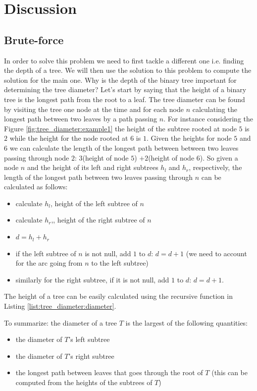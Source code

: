\section{Discussion}
\label{tree_diameter:sec:discussion}


\subsection{Brute-force}
\label{tree_diameter:sec:bruteforce}

In order to  solve this problem we need to  first tackle a different one i.e. finding the depth of a tree. We will then use the solution to this problem to compute the solution for the main one. 
Why is the depth of the binary tree important for determining the tree diameter? Let's start by saying that the height of a binary tree is the longest path from the root to a leaf. The tree diameter can be found by visiting the tree one node at the time and for each node $n$ calculating the longest path between two leaves by a path passing $n$. For instance considering the Figure \ref{fig:tree_diameter:example1} the height of the subtree rooted at node $5$ is $2$ while the height for the node rooted at $6$ is $1$. Given the heights for node $5$ and $6$ we can calculate the length of the longest path between between two leaves  passing through node $2$: $3$(height of node $5$) $+2$(height of node $6$). So given a node $n$ and the height of its left and right subtrees $h_l$ and $h_r$, respectively, the length of the longest path between two leaves passing through $n$ can be calculated as follows:

\begin{itemize}
	\item calculate $h_l$, height of the left subtree  of $n$
	\item calculate $h_r$,, height of the right subtree  of $n$
	\item $d=h_l+h_r$
	\item if the left subtree of $n$ is not null, add $1$ to $d$: $d=d+1$ (we need to account for the arc going from $n$ to the left subtree)
	\item similarly for the right subtree, if it is not null, add $1$ to $d$: $d=d+1$.
\end{itemize}

The height of a tree can be easily calculated using the recursive function  in Listing \ref{list:tree_diameter:diameter}.

To summarize:  the diameter of a tree $T$ is the largest of the following quantities:
\begin{itemize}
    \item the diameter of $T$'s left subtree
    \item the diameter of $T$'s right subtree
    \item the longest path between leaves that goes through the root of $T$ (this can be computed from the heights of the subtrees of $T$) 
\end{itemize}

